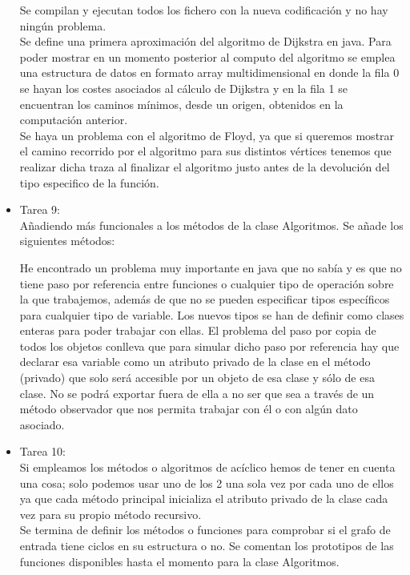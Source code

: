 \begin{itemize}
Se compilan y ejecutan todos los fichero con la nueva codificación y no hay ningún problema.\\

Se define una primera aproximación del algoritmo de Dijkstra en java. Para poder mostrar en un momento posterior al computo del algoritmo se emplea una estructura de datos en formato array multidimensional en donde la fila 0 se hayan los costes asociados al cálculo de Dijkstra y en la fila 1 se encuentran los caminos mínimos, desde un origen, obtenidos en la computación anterior.\\

Se haya un problema con el algoritmo de Floyd, ya que si queremos mostrar el camino recorrido por el algoritmo para sus distintos vértices tenemos que realizar dicha traza al finalizar el algoritmo justo antes de la devolución del tipo especifico de la función.\\

\item Tarea 9:\\
Añadiendo más funcionales a los métodos de la clase Algoritmos. Se añade los siguientes métodos:



He encontrado un problema muy importante en java que no sabía y es que no tiene paso por referencia entre funciones o cualquier tipo de operación sobre la que trabajemos, además de que no se pueden especificar tipos específicos para cualquier tipo de variable. Los nuevos tipos se han de definir como clases enteras para poder trabajar con ellas. El problema del paso por copia de todos los objetos conlleva que para simular dicho paso por referencia hay que declarar esa variable como un atributo privado de la clase en el método (privado) que solo será accesible por un objeto de esa clase y sólo de esa clase. No se podrá exportar fuera de ella a no ser que sea a través de un método observador que nos permita trabajar con él o con algún dato asociado.\\

\item Tarea 10:\\
Si empleamos los métodos o algoritmos de acíclico hemos de tener en cuenta una cosa; solo podemos usar uno de los 2 una sola vez por cada uno de ellos ya que cada método principal inicializa el atributo privado de la clase cada vez para su propio método recursivo.\\

Se termina de definir los métodos o funciones para comprobar si el grafo de entrada tiene ciclos en su estructura o no. Se comentan los prototipos de las funciones disponibles hasta el momento para la clase Algoritmos.\\


\end{itemize}
